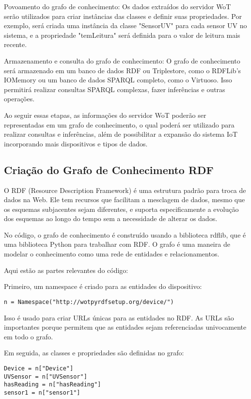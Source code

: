 Povoamento do grafo de conhecimento: Os dados extraídos do servidor WoT serão utilizados para criar instâncias das classes e definir suas propriedades. Por exemplo, será criada uma instância da classe "SensorUV" para cada sensor UV no sistema, e a propriedade "temLeitura" será definida para o valor de leitura mais recente.

Armazenamento e consulta do grafo de conhecimento: O grafo de conhecimento será armazenado em um banco de dados RDF ou Triplestore, como o RDFLib's IOMemory ou um banco de dados SPARQL completo, como o Virtuoso. Isso permitirá realizar consultas SPARQL complexas, fazer inferências e outras operações.

Ao seguir essas etapas, as informações do servidor WoT poderão ser representadas em um grafo de conhecimento, o qual poderá ser utilizado para realizar consultas e inferências, além de possibilitar a expansão do sistema IoT incorporando mais dispositivos e tipos de dados.

\subsection{Criação do Grafo de Conhecimento RDF}

 O RDF (Resource Description Framework) é uma estrutura padrão para troca de dados na Web. Ele tem recursos que facilitam a mesclagem de dados, mesmo que os esquemas subjacentes sejam diferentes, e suporta especificamente a evolução dos esquemas ao longo do tempo sem a necessidade de alterar os dados.

No código, o grafo de conhecimento é construído usando a biblioteca rdflib, que é uma biblioteca Python para trabalhar com RDF. O grafo é uma maneira de modelar o conhecimento como uma rede de entidades e relacionamentos.

Aqui estão as partes relevantes do código:

Primeiro, um namespace é criado para as entidades do dispositivo:
\begin{verbatim}
n = Namespace("http://wotpyrdfsetup.org/device/")
\end{verbatim}

Isso é usado para criar URLs únicas para as entidades no RDF. As URLs são importantes porque permitem que as entidades sejam referenciadas univocamente em todo o grafo.

Em seguida, as classes e propriedades são definidas no grafo:
\begin{verbatim}
Device = n["Device"]
UVSensor = n["UVSensor"]
hasReading = n["hasReading"]
sensor1 = n["sensor1"]
\end{verbatim}

